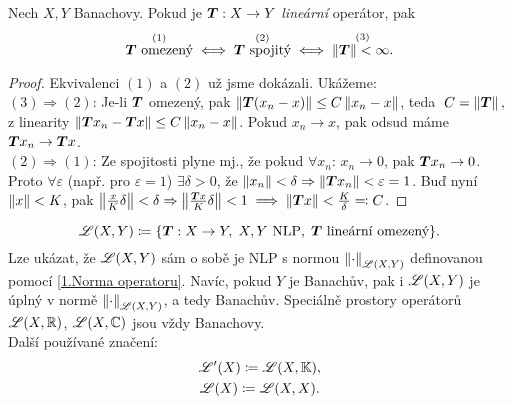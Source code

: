\begin{lemma}
Nech $X,Y$ Banachovy. Pokud je $\boldsymbol{T}: X \to Y$ \emph{lineární} operátor, pak
$$
    \overset{(1)}{\boldsymbol{T} \text{ omezený}}
    \iff
    \overset{(2)}{\boldsymbol{T} \text{ spojitý}}
    \iff
    \overset{(3)}{\left\lVert\boldsymbol{T}\right\rVert < \infty.}
$$
\end{lemma}
\begin{proof}
Ekvivalenci $(1)$ a $(2)$ už jsme dokázali. Ukážeme:
\\[5pt]
$(3) \Rightarrow (2)$: Je-li $\boldsymbol{T}$ omezený, pak $\left\lVert\boldsymbol{T} (x_n - x)\right\rVert \leq C \left\lVert x_n - x\right\rVert$, teda $\; C = \left\lVert\boldsymbol{T}\right\rVert, \;$ z linearity $\left\lVert\boldsymbol{T}x_n - \boldsymbol{T}x\right\rVert \leq C \left\lVert x_n - x\right\rVert$. Pokud $x_n \to x$, pak odsud máme $\boldsymbol{T}x_n \to \boldsymbol{T}x$.
\\[5pt]
$(2) \Rightarrow (1)$: Ze spojitosti plyne mj., že pokud $\forall x_n$: $x_n \to 0$, pak $\boldsymbol{T}x_n \to 0$. Proto $\forall \varepsilon$ (např. pro $\varepsilon = 1$) $\exists \delta>0$, že $\left\lVert x_n\right\rVert < \delta \Rightarrow \left\lVert\boldsymbol{T}x_n\right\rVert < \varepsilon = 1$. Buď nyní $\left\lVert x\right\rVert < K$, pak $\left\lVert\frac{x}{K} \delta\right\rVert < \delta \Rightarrow \left\lVert\frac{\boldsymbol{T}x}{K} \delta\right\rVert < 1 \implies \left\lVert\boldsymbol{T}x\right\rVert < \frac{K}{\delta} \eqqcolon C$.
\end{proof}

\begin{definition}

$$
    \mathscr{L}(X, Y)
    \coloneqq
    \{
        \boldsymbol{T}: X \to Y, \;
        X,Y \text{ NLP}, \;
        \boldsymbol{T} \text{ lineární omezený}
    \}.
$$
Lze ukázat, že $\mathscr{L}(X, Y)$ sám o sobě je NLP s normou $\left\lVert\cdot\right\rVert_{\mathscr{L}(X,Y)}$ definovanou pomocí \ref{1.Norma operatoru}. Navíc, pokud $Y$ je Banachův, pak i $\mathscr{L}(X, Y)$ je úplný v normě $\left\lVert\cdot\right\rVert_{\mathscr{L}(X,Y)}$, a tedy Banachův. Speciálně prostory operátorů $\mathscr{L}(X, \mathbb{R})$, $\mathscr{L}(X, \mathbb{C})$ jsou vždy Banachovy.
\\
Další používané značení:
\begin{gather*}
    \mathscr{L}'(X) \coloneqq \mathscr{L}(X, \mathbb{K}), \\
    \mathscr{L}(X) \coloneqq \mathscr{L}(X, X).
\end{gather*}
\end{definition}

